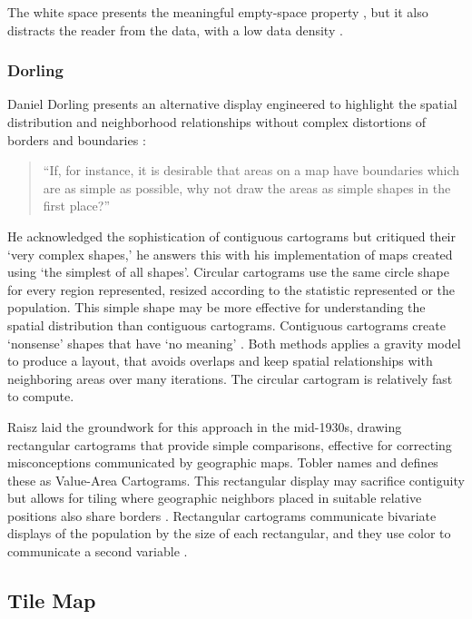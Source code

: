 \documentclass{monashthesis}
\begin{document}
The white space presents the meaningful empty-space property \autocite{ECGC}, \autocite{NAC} but it also distracts the reader from the data, with a low data density \autocite{TVDQI}.

\hypertarget{dorling}{%
\subsubsection{Dorling}\label{dorling}}

Daniel Dorling presents an alternative display engineered to highlight the spatial distribution and neighborhood relationships without complex distortions of borders and boundaries \autocite{ACTUC}:

\begin{quote}
``If, for instance, it is desirable that areas on a map have boundaries which are as simple as possible, why not draw the areas as simple shapes in the first place?''
\end{quote}

He acknowledged the sophistication of contiguous cartograms but critiqued their `very complex shapes,' he answers this with his implementation of maps created using `the simplest of all shapes'. Circular cartograms use the same circle shape for every region represented, resized according to the statistic represented or the population. This simple shape may be more effective for understanding the spatial distribution than contiguous cartograms. Contiguous cartograms create `nonsense' shapes that have `no meaning' \autocite{NISCC}. Both methods applies a gravity model to produce a layout, that avoids overlaps and keep spatial relationships with neighboring areas over many iterations. The circular cartogram is relatively fast to compute.

Raisz \autocite{RSCW} laid the groundwork for this approach in the mid-1930s, drawing rectangular cartograms that provide simple comparisons, effective for correcting misconceptions communicated by geographic maps. Tobler \autocite{TFYCC} names and defines these as Value-Area Cartograms. This rectangular display may sacrifice contiguity but allows for tiling where geographic neighbors placed in suitable relative positions also share borders \autocite{CDWCS}. Rectangular cartograms communicate bivariate displays of the population by the size of each rectangular, and they use color to communicate a second variable \autocite{ORC}.

\hypertarget{tile-map}{%
\subsection{Tile Map}\label{tile-map}}
\end{document}
